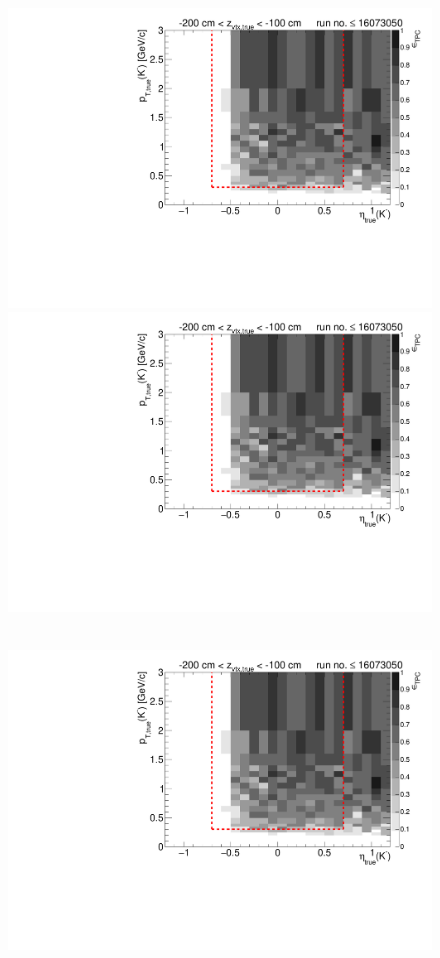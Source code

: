\begin{figure}[hb]
{  \includegraphics[width=\linewidth,page=7]{graphics/eff/Eff2D_TPC_kaon_Minus_RunRange1.pdf}\\
  \includegraphics[width=\linewidth,page=9]{graphics/eff/Eff2D_TPC_kaon_Minus_RunRange1.pdf}
}~
\parbox{0.495\textwidth}{
  \centering
  \includegraphics[width=\linewidth,page=4]{graphics/eff/Eff2D_TPC_kaon_Minus_RunRange1.pdf}\\
}
\end{figure}
